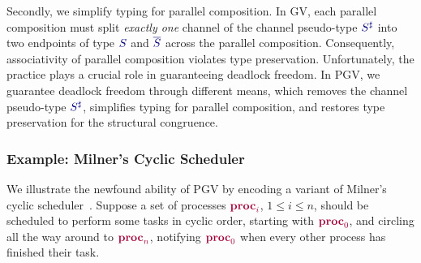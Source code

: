 \documentclass[main.tex]{subfiles}
\begin{document}
Secondly, we simplify typing for parallel composition. In GV, each parallel composition must split \emph{exactly one} channel of the channel pseudo-type $\ty{S^\sharp}$ into two endpoints of type $\ty{S}$ and $\ty{\co{S}}$ across the parallel composition. Consequently, associativity of parallel composition violates type preservation. Unfortunately, the practice plays a crucial role in guaranteeing deadlock freedom. In PGV, we guarantee deadlock freedom through different means, which removes the channel pseudo-type $\ty{S^\sharp}$, simplifies typing for parallel composition, and restores type preservation for the structural congruence.




\subsubsection*{Example: Milner's Cyclic Scheduler}\label{sec:pgv-example}
We illustrate the newfound ability of PGV by encoding a variant of Milner's cyclic scheduler~\cite{milner89,dardhagay18}. Suppose a set of processes $\tm{\proc{i}}$, $1\leq{i}\leq{n}$, should be scheduled to perform some tasks in cyclic order, starting with $\tm{\proc0}$, and circling all the way around to $\tm{\proc{n}}$, notifying $\tm{\proc0}$ when every other process has finished their task.
\end{document}
